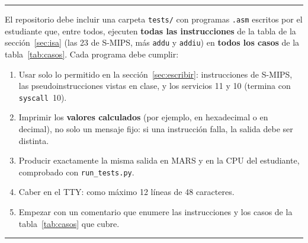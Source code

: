 \documentclass[11pt,a4paper]{article}
\newcommand{\sig}[1]{\texttt{#1}}
\newcommand{\req}[1]{\textbf{[#1]}}
\newenvironment{obligatorio}{\begin{center}\begin{minipage}{0.95\linewidth}\hrule\smallskip}{\smallskip\hrule\end{minipage}\end{center}}
\begin{document}
\begin{obligatorio}
\begin{description}[leftmargin=1.2cm,style=nextline]
\item[\req{R21}] El repositorio debe incluir una carpeta \sig{tests/} con programas \sig{.asm} escritos por el estudiante que, entre todos, ejecuten \textbf{todas las instrucciones} de la tabla de la sección~\ref{sec:isa} (las 23 de S-MIPS, más \sig{addu} y \sig{addiu}) en \textbf{todos los casos} de la tabla~\ref{tab:casos}. Cada programa debe cumplir:
\begin{enumerate}
\item Usar solo lo permitido en la sección~\ref{sec:escribir}: instrucciones de S-MIPS, las pseudoinstrucciones vistas en clase, y los servicios 11 y 10 (termina con \sig{syscall}~10).
\item Imprimir los \textbf{valores calculados} (por ejemplo, en hexadecimal o en decimal), no solo un mensaje fijo: si una instrucción falla, la salida debe ser distinta.
\item Producir exactamente la misma salida en MARS y en la CPU del estudiante, comprobado con \sig{run\_tests.py}.
\item Caber en el TTY: como máximo 12 líneas de 48 caracteres.
\item Empezar con un comentario que enumere las instrucciones y los casos de la tabla~\ref{tab:casos} que cubre.
\end{enumerate}
\end{description}
\end{obligatorio}
\end{document}
